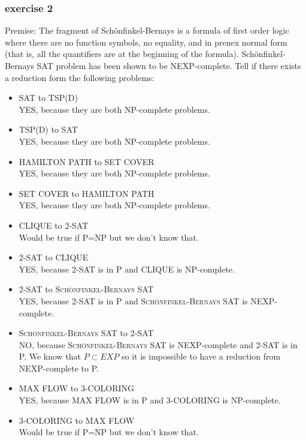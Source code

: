 \documentclass[12pt]{article}
\begin{document}
\subsubsection{exercise 2}
Premise: The fragment of Schönfinkel-Bernays is a formula of first order logic where there are no function symbols, no equality, and in prenex normal form (that is, all the quantifiers are at the beginning of the formula). Schönfinkel-Bernays SAT problem has been shown to be NEXP-complete.
Tell if there exists a reduction form the following problems:
\begin{itemize}
  \item \textsc{SAT} to \textsc{TSP(D)}\\
  YES, because they are both NP-complete problems.
  \item \textsc{TSP(D)} to \textsc{SAT}\\
  YES, because they are both NP-complete problems.
  \item \textsc{HAMILTON PATH} to \textsc{SET COVER}\\
  YES, because they are both NP-complete problems.
  \item \textsc{SET COVER} to \textsc{HAMILTON PATH}\\
  YES, because they are both NP-complete problems.
  \item \textsc{CLIQUE} to \textsc{2-SAT}\\
  Would be true if \textsc{P=NP} but we don't know that.
  \item \textsc{2-SAT} to \textsc{CLIQUE}\\
  YES, because \textsc{2-SAT} is in P and \textsc{CLIQUE} is NP-complete.
  \item \textsc{2-SAT} to \textsc{Schönfinkel-Bernays SAT}\\
  YES, because \textsc{2-SAT} is in P and \textsc{Schönfinkel-Bernays SAT} is NEXP-complete.
  \item \textsc{Schönfinkel-Bernays SAT} to \textsc{2-SAT}\\
  NO, because \textsc{Schönfinkel-Bernays SAT} is NEXP-complete and \textsc{2-SAT} is in P. We know that $P\subset EXP$ so it is impossible to have a reduction from NEXP-complete to P.
  \item \textsc{MAX FLOW} to \textsc{3-COLORING}\\
  YES, because \textsc{MAX FLOW} is in P and \textsc{3-COLORING} is NP-complete.
  \item \textsc{3-COLORING} to \textsc{MAX FLOW}\\
  Would be true if \textsc{P=NP} but we don't know that.
\end{itemize}
\end{document}
